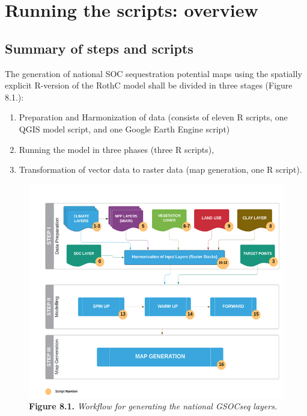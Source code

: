 \documentclass[
  10pt,
  b5paper,
]{book}
\providecommand{\tightlist}{%
  \setlength{\itemsep}{0pt}\setlength{\parskip}{0pt}}
\begin{document}
\hypertarget{running-the-scripts-overview}{%
\chapter{\textbar{} Running the scripts: overview}\label{running-the-scripts-overview}}

\hypertarget{summary-of-steps-and-scripts}{%
\section{Summary of steps and scripts}\label{summary-of-steps-and-scripts}}

The generation of national SOC sequestration potential maps using the spatially explicit R-version of the RothC model shall be divided in three stages (Figure 8.1.):

\begin{enumerate}
\def\labelenumi{\arabic{enumi}.}
\tightlist
\item
  Preparation and Harmonization of data (consists of eleven R scripts, one QGIS model script, and one Google Earth Engine script)
\item
  Running the model in three phases (three R scripts),
\item
  Transformation of vector data to raster data (map generation, one R script).
\end{enumerate}

\begin{figure}
\centering
\includegraphics{images/Figure_8.1.png}
\caption{\textbf{Figure 8.1.} \emph{Workflow for generating the national GSOCseq layers.}}
\end{figure}
\end{document}
